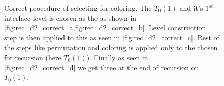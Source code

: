      
     \begin{figure}[thbp]
     	\centering
     	\hspace{0.6em}
     	\hspace{0.6em}
     	\hspace{0.6em}
     	\hspace{0.6em}
     	\caption{Correct procedure of selecting \subgraph for \DTWO coloring. The \levelGroup $T_0(1)$ and it's $1^{st}$ interface level is chosen as the \subgraph as shown in \cref{fig:rec_d2_correct_a,fig:rec_d2_correct_b}. Level construction step is then applied to this \subgraph as seen in \cref{fig:rec_d2_correct_c}. Rest of the steps like permutation and \DK coloring is applied only to the \subgraph  chosen for recursion (here $T_0(1)$). Finally as seen in \cref{fig:rec_d2_correct_d} we get three \levelGroups at the end of recursion on $T_0(1)$.}
     	\label{fig:rec_d2_correct}
     \end{figure}
     

